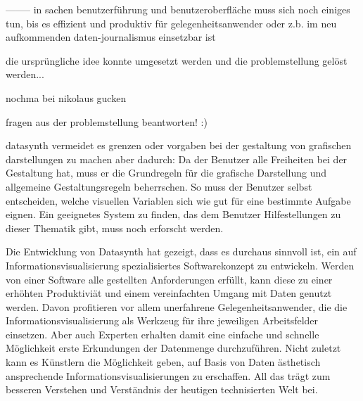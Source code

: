 \documentclass[a4paper, 
               12pt,
               DIV=calc,
               version=first,
               pdftex,
               headsepline,
               footsepline,
               bibtotocnumbered,
               liststotocnumbered]{scrreprt}
\begin{document}
--------
in sachen benutzerführung und benutzeroberfläche muss sich noch einiges tun,
bis es effizient und produktiv für gelegenheitsanwender oder z.b.
im neu aufkommenden daten-journalismus einsetzbar ist

die ursprüngliche idee konnte umgesetzt werden und die problemstellung
gelöst werden...

nochma bei nikolaus gucken

fragen aus der problemstellung beantworten! :)

datasynth vermeidet es grenzen oder vorgaben bei der gestaltung von
grafischen darstellungen zu machen aber dadurch:
Da der Benutzer alle Freiheiten bei der Gestaltung hat, muss er die
Grundregeln für die grafische Darstellung und allgemeine Gestaltungsregeln beherrschen.
So muss der Benutzer selbst entscheiden, welche visuellen Variablen sich wie 
gut für eine bestimmte Aufgabe eignen. Ein geeignetes System zu finden, das dem
Benutzer Hilfestellungen zu dieser Thematik gibt, muss noch erforscht werden.

Die Entwicklung von Datasynth hat gezeigt, dass es durchaus sinnvoll ist,
ein auf Informationsvisualisierung spezialisiertes Softwarekonzept zu entwickeln.
Werden von einer Software alle gestellten Anforderungen erfüllt, kann
diese zu einer erhöhten Produktiviät und einem vereinfachten Umgang mit
Daten genutzt werden. Davon profitieren vor allem unerfahrene Gelegenheitsanwender,
die die Informationsvisualisierung als Werkzeug für ihre jeweiligen Arbeitsfelder
einsetzen. Aber auch Experten erhalten damit eine einfache und schnelle Möglichkeit
erste Erkundungen der Datenmenge durchzuführen. Nicht zuletzt kann es Künstlern
die Möglichkeit geben, auf Basis von Daten ästhetisch ansprechende
Informationsvisualisierungen zu erschaffen. All das trägt zum besseren
Verstehen und Verständnis der heutigen technisierten Welt bei.
\end{document}

